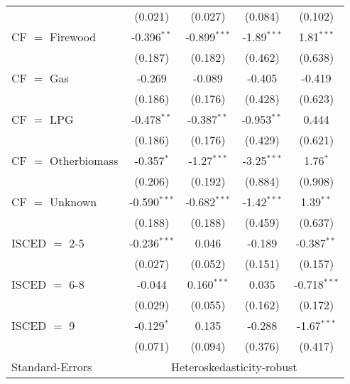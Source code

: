 \begin{table}[htbp!]
\begin{adjustbox}{width = 1\textwidth, max height = 0.95\textheight, center}
\begin{threeparttable}[b]
\begin{tabular}{lcccc}
                                 & (0.021)            & (0.027)            & (0.084)       & (0.102)\\   
            CF $=$ Firewood      & -0.396$^{**}$      & -0.899$^{***}$     & -1.89$^{***}$ & 1.81$^{***}$\\   
                                 & (0.187)            & (0.182)            & (0.462)       & (0.638)\\   
            CF $=$ Gas           & -0.269             & -0.089             & -0.405        & -0.419\\   
                                 & (0.186)            & (0.176)            & (0.428)       & (0.623)\\   
            CF $=$ LPG           & -0.478$^{**}$      & -0.387$^{**}$      & -0.953$^{**}$ & 0.444\\   
                                 & (0.186)            & (0.176)            & (0.429)       & (0.621)\\   
            CF $=$ Otherbiomass  & -0.357$^{*}$       & -1.27$^{***}$      & -3.25$^{***}$ & 1.76$^{*}$\\   
                                 & (0.206)            & (0.192)            & (0.884)       & (0.908)\\   
            CF $=$ Unknown       & -0.590$^{***}$     & -0.682$^{***}$     & -1.42$^{***}$ & 1.39$^{**}$\\   
                                 & (0.188)            & (0.188)            & (0.459)       & (0.637)\\   
            ISCED $=$ 2-5        & -0.236$^{***}$     & 0.046              & -0.189        & -0.387$^{**}$\\   
                                 & (0.027)            & (0.052)            & (0.151)       & (0.157)\\   
            ISCED $=$ 6-8        & -0.044             & 0.160$^{***}$      & 0.035         & -0.718$^{***}$\\   
                                 & (0.029)            & (0.055)            & (0.162)       & (0.172)\\   
            ISCED $=$ 9          & -0.129$^{*}$       & 0.135              & -0.288        & -1.67$^{***}$\\   
                                 & (0.071)            & (0.094)            & (0.376)       & (0.417)\\   
            \midrule 
            Standard-Errors & \multicolumn{4}{c}{Heteroskedasticity-robust} \\ 

\end{tabular}
\end{threeparttable}
\end{adjustbox}
\end{table}

